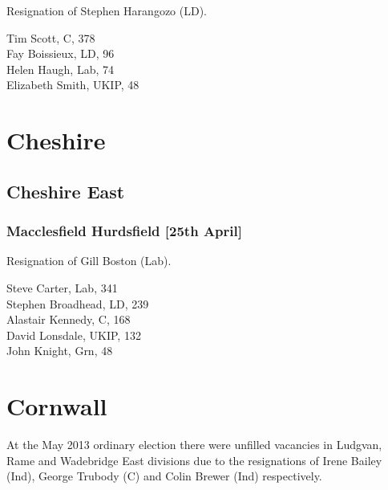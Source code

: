 \documentclass[a4paper,openany,10pt]{book}
\begin{document}

Resignation of Stephen Harangozo (LD).



Tim Scott, C, 378\\
Fay Boissieux, LD, 96\\
Helen Haugh, Lab, 74\\
Elizabeth Smith, UKIP, 48\\


\section{Cheshire}

\subsection*{Cheshire East}

\subsubsection*{Macclesfield Hurdsfield \hspace*{\fill}\nolinebreak[1]%
\enspace\hspace*{\fill}
[25th April]}


Resignation of Gill Boston (Lab).



Steve Carter, Lab, 341\\
Stephen Broadhead, LD, 239\\
Alastair Kennedy, C, 168\\
David Lonsdale, UKIP, 132\\
John Knight, Grn, 48\\


\vfill

\section{Cornwall}

At the May 2013 ordinary election there were unfilled vacancies in Ludgvan, Rame and Wadebridge East divisions due to the resignations of Irene Bailey (Ind), George Trubody (C) and Colin Brewer (Ind) respectively.

\end{document}

